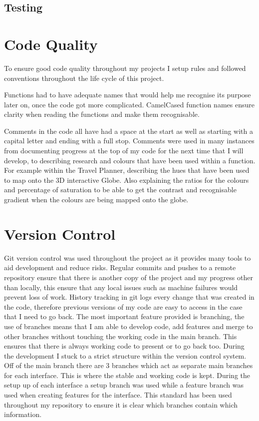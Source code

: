 \documentclass[]{project_final}
\begin{document}
\subsection{Testing}
\section{Code Quality}
To ensure good code quality throughout my projects I setup rules and followed conventions throughout the life cycle of this project.

Functions had to have adequate names that would help me recognise its purpose later on, once the code got more complicated. CamelCased function names ensure clarity when reading the functions and make them recognisable.

Comments in the code all have had a space at the start as well as starting with a capital letter and ending with a full stop. Comments were used in many instances from documenting progress at the top of my code for the next time that I will develop, to describing research and colours that have been used within a function. For example within the Travel Planner, describing the hues that have been used to map onto the 3D interactive Globe. Also explaining the ratios for the colours and percentage of saturation to be able to get the contrast and recognisable gradient when the colours are being mapped onto the globe.


\section{Version Control}
Git version control was used throughout the project as it provides many tools to aid development and reduce risks. Regular commits and pushes to a remote repository ensure that
there is another copy of the project and my progress other than locally, this ensure that any
local issues such as machine failures would prevent loss of work.
History tracking in git logs every change that was created in the code, therefore previous
versions of my code are easy to access in the case that I need to go back.
The most important feature provided is branching, the use of branches means that I am able
to develop code, add features and merge to other branches without touching the working
code in the main branch. This ensures that there is always working code to present or to go
back too.
During the development I stuck to a strict structure within the version control system. Off of
the main branch there are 3 branches which act as separate main branches for each interface.
This is where the stable and working code is kept. During the setup up of each interface
a setup branch was used while a feature branch was used when creating features for the
interface. This standard has been used throughout my repository to ensure it is clear which
branches contain which information.
\end{document}
